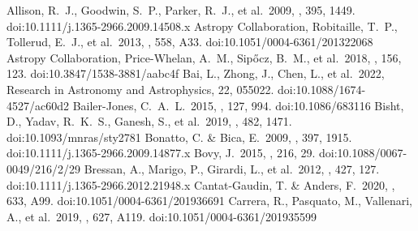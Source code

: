 \documentclass{aa} %
\begin{document}
%
\begin{thebibliography}{}
     Allison, R.~J., Goodwin, S.~P., Parker, R.~J., et al.\ 2009, \mnras, 395, 1449. doi:10.1111/j.1365-2966.2009.14508.x
     Astropy Collaboration, Robitaille, T.~P., Tollerud, E.~J., et al.\ 2013, \aap, 558, A33. doi:10.1051/0004-6361/201322068
     Astropy Collaboration, Price-Whelan, A.~M., Sip{\H{o}}cz, B.~M., et al.\ 2018, \aj, 156, 123. doi:10.3847/1538-3881/aabc4f
     Bai, L., Zhong, J., Chen, L., et al.\ 2022, Research in Astronomy and Astrophysics, 22, 055022. doi:10.1088/1674-4527/ac60d2
     Bailer-Jones, C.~A.~L.\ 2015, \pasp, 127, 994. doi:10.1086/683116
     Bisht, D., Yadav, R.~K.~S., Ganesh, S., et al.\ 2019, \mnras, 482, 1471. doi:10.1093/mnras/sty2781
     Bonatto, C. \& Bica, E.\ 2009, \mnras, 397, 1915. doi:10.1111/j.1365-2966.2009.14877.x
     Bovy, J.\ 2015, \apjs, 216, 29. doi:10.1088/0067-0049/216/2/29
     Bressan, A., Marigo, P., Girardi, L., et al.\ 2012, \mnras, 427, 127. doi:10.1111/j.1365-2966.2012.21948.x
     Cantat-Gaudin, T. \& Anders, F.\ 2020, \aap, 633, A99. doi:10.1051/0004-6361/201936691
     Carrera, R., Pasquato, M., Vallenari, A., et al.\ 2019, \aap, 627, A119. doi:10.1051/0004-6361/201935599

\end{thebibliography}
\end{document}
